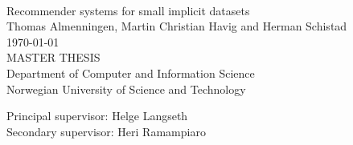 \documentclass[10pt,a4paper,oneside]{report}
\newcommand{\HRule}{\rule{\linewidth}{0.5mm}} %
\def \thesistitle{Recommender systems for small implicit datasets}
\def \authorname{Thomas Almenningen, Martin Christian Havig and Herman Schistad}
\def \supheri{Heri Ramampiaro}
\def \suphelge{Helge Langseth}
\begin{document}

\begin{titlepage}
\begin{center}
\mbox{}\\[6pc]
\begin{center}
\Huge{\thesistitle}\\[2pc]

\Large{\authorname}\\[1pc]
\large{\today}\\[2pc]

MASTER THESIS\\
Department of Computer and Information Science\\
Norwegian University of Science and Technology
\end{center}
\vfill

\noindent Principal supervisor: \suphelge \\
\noindent Secondary supervisor: \supheri

%



\end{center}
\end{titlepage}
\end{document}
